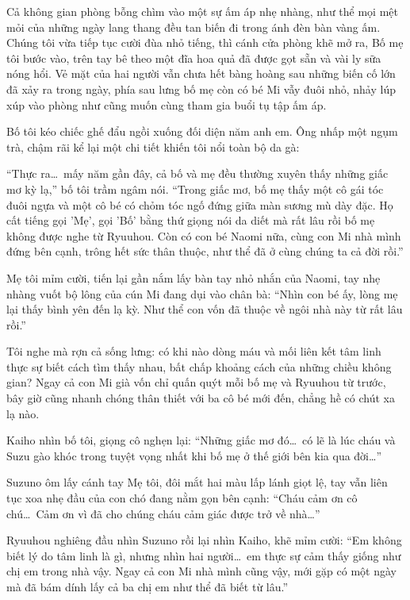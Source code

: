 ﻿\documentclass[../main.tex]{subfiles}
\begin{document}
Cả không gian phòng bỗng chìm vào một sự ấm áp nhẹ nhàng, như thể mọi mệt mỏi của những ngày lang thang đều tan biến đi trong ánh đèn bàn vàng ấm. Chúng tôi vừa tiếp tục cười đùa nhỏ tiếng, thì cánh cửa phòng khẽ mở ra, Bố mẹ tôi bước vào, trên tay bê theo một đĩa hoa quả đã được gọt sẵn và vài ly sữa nóng hổi. Vẻ mặt của hai người vẫn chưa hết bàng hoàng sau những biến cố lớn đã xảy ra trong ngày, phía sau lưng bố mẹ còn có bé Mi vẫy đuôi nhỏ, nhảy lúp xúp vào phòng như cũng muốn cùng tham gia buổi tụ tập ấm áp.

Bố tôi kéo chiếc ghế đẩu ngồi xuống đối diện năm anh em. Ông nhấp một ngụm trà, chậm rãi kể lại một chi tiết khiến tôi nổi toàn bộ da gà:

``Thực ra\dots\ mấy năm gần đây, cả bố và mẹ đều thường xuyên thấy những giấc mơ kỳ lạ,'' bố tôi trầm ngâm nói. ``Trong giấc mơ, bố mẹ thấy một cô gái tóc đuôi ngựa và một cô bé có chỏm tóc ngố đứng giữa màn sương mù dày đặc. Họ cất tiếng gọi 'Mẹ', gọi 'Bố' bằng thứ giọng nói da diết mà rất lâu rồi bố mẹ không được nghe từ Ryuuhou. Còn có con bé Naomi nữa, cùng con Mi nhà mình đứng bên cạnh, trông hết sức thân thuộc, như thể đã ở cùng chúng ta cả đời rồi.''

Mẹ tôi mỉm cười, tiến lại gần nắm lấy bàn tay nhỏ nhắn của Naomi, tay nhẹ nhàng vuốt bộ lông của cún Mi đang dụi vào chân bà: ``Nhìn con bé ấy, lòng mẹ lại thấy bình yên đến lạ kỳ. Như thể con vốn đã thuộc về ngôi nhà này từ rất lâu rồi.''

Tôi nghe mà rợn cả sống lưng: có khi nào dòng máu và mối liên kết tâm linh thực sự biết cách tìm thấy nhau, bất chấp khoảng cách của những chiều không gian? Ngay cả con Mi già vốn chỉ quấn quýt mỗi bố mẹ và Ryuuhou từ trước, bây giờ cũng nhanh chóng thân thiết với ba cô bé mới đến, chẳng hề có chút xa lạ nào.

Kaiho nhìn bố tôi, giọng cô nghẹn lại: ``Những giấc mơ đó\dots\ có lẽ là lúc cháu và Suzu gào khóc trong tuyệt vọng nhất khi bố mẹ ở thế giới bên kia qua đời\dots''

Suzuno ôm lấy cánh tay Mẹ tôi, đôi mắt hai màu lấp lánh giọt lệ, tay vẫn liên tục xoa nhẹ đầu của con chó đang nằm gọn bên cạnh: ``Cháu cảm ơn cô chú\dots\ Cảm ơn vì đã cho chúng cháu cảm giác được trở về nhà\dots''

Ryuuhou nghiêng đầu nhìn Suzuno rồi lại nhìn Kaiho, khẽ mỉm cười: ``Em không biết lý do tâm linh là gì, nhưng nhìn hai người\dots\ em thực sự cảm thấy giống như chị em trong nhà vậy. Ngay cả con Mi nhà mình cũng vậy, mới gặp có một ngày mà đã bám dính lấy cả ba chị em như thể đã biết từ lâu.''
\end{document}
